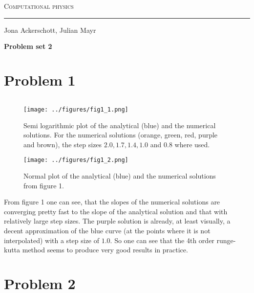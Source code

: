 \documentclass[12pt,a4paper]{article}
\newenvironment{code}{\captionsetup{type=listing}}{}
\begin{document}
\centerline{\Huge\scshape Computational physics}
\vspace*{0.5cm}
\hrule
\vspace*{0.5cm}
\centerline{Jona Ackerschott, Julian Mayr}
\vspace*{1cm}
\centerline{\Large\bfseries Problem set 2}
\vspace*{0.5cm}

\section*{Problem 1}

\begin{code}
	\inputminted{python}{../problem1.py}
\end{code}

\begin{figure}[h]
	\texttt{[image: ../figures/fig1\_1.png]}
	\caption{Semi logarithmic plot of the analytical (blue) and the numerical solutions. For the numerical 	solutions (orange, green, red, purple and brown), the step sizes $2.0, 1.7, 1.4, 1.0$ and $0.8$ where 		used.}
\end{figure}
\begin{figure}[h]
	\texttt{[image: ../figures/fig1\_2.png]}
	\caption{Normal plot of the analytical (blue) and the numerical solutions from figure 1.}
\end{figure}

\newpage

\noindent
From figure 1 one can see, that the slopes of the numerical solutions are converging pretty fast to the slope of the analytical solution and that with relatively large step sizes. The purple solution is already, at least visually, a decent approximation of the blue curve (at the points where it is not interpolated) with a step size of $1.0$. So one can see that the 4th order runge-kutta method seems to produce very good results in practice.

\section*{Problem 2}
\begin{code}
	\inputminted{python}{../problem2.py}
\end{code}
\end{document}
